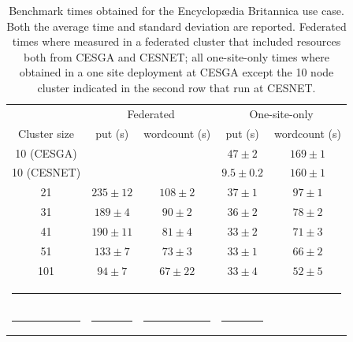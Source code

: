 \documentclass[oribibl]{llncs_Ibergrid2013}
\begin{document}
\begin{table}[h!]
\caption{Benchmark times obtained for the Encyclop{\ae}dia Britannica use case. Both the average time and standard deviation are reported. Federated times where measured in a federated cluster that included resources both from CESGA and CESNET; all one-site-only times where obtained in a one site deployment at CESGA except the 10 node cluster indicated in the second row that run at CESNET. }
\label{table:britannica}
%
\vspace{-0.5em}
%
\begin{center}
\begin{tabular}{ccccc}
\toprule
					& \multicolumn{2}{c}{Federated} 		& \multicolumn{2}{c}{One-site-only} \\
Cluster size				& put (s)		& wordcount (s) 	& put (s)		& wordcount (s)\\
\midrule
10 (CESGA)             			&        		&               	& $47\pm2$		& $169\pm1$\\
10 (CESNET)          			& 			&  			& $9.5\pm0.2$		& $160\pm1$\\
21                   			& $235\pm12$		& $108\pm2$     	& $37\pm1$		& $97\pm1$\\
31                   			& $189\pm4$		& $90\pm2$      	& $36\pm2$		& $78\pm2$\\
41                   			& $190\pm11$		& $81\pm4$      	& $33\pm2$		& $71\pm3$\\
51                   			& $133\pm7$		& $73\pm3$      	& $33\pm1$		& $66\pm2$\\
101                  			& $94\pm7$		& $67\pm22$      	& $33\pm4$		& $52\pm5$\\
%
\bottomrule
\multicolumn{5}{c}{\rule{0.98\textwidth}{0em}}\\
\rule{0.2\textwidth}{0cm} & \rule{0.2\textwidth}{0cm} & \rule{0.2\textwidth}{0cm} &  \rule{0.2\textwidth}{0cm} & \\
\end{tabular}
\end{center}
\end{table}
\end{document}
